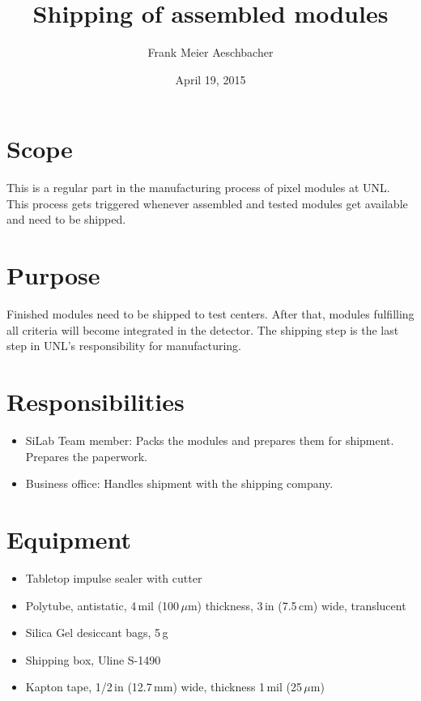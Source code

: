 \documentclass[12pt]{unlsilabsop}
\title{Shipping of assembled modules}
\date{April 19, 2015}
\author{Frank Meier Aeschbacher}
\begin{document}
\maketitle

\section{Scope}
This is a regular part in the manufacturing process of pixel modules at UNL. This process gets triggered whenever assembled and tested modules get available and need to be shipped.

\section{Purpose}
Finished modules need to be shipped to test centers. After that, modules fulfilling all criteria will become integrated in the detector. The shipping step is the last step in UNL's responsibility for manufacturing.


\section{Responsibilities}

\begin{itemize}
    \item SiLab Team member: Packs the modules and prepares them for shipment. Prepares the paperwork.
    \item Business office: Handles shipment with the shipping company.
\end{itemize}

\section{Equipment}

\begin{itemize}
    \item Tabletop impulse sealer with cutter
    \item Polytube, antistatic, 4\,mil (100\,$\mu$m) thickness, 3\,in (7.5\,cm) wide, translucent
    \item Silica Gel desiccant bags, 5\,g
    \item Shipping box, Uline S-1490
    \item Kapton tape, 1/2\,in (12.7\,mm) wide, thickness 1\,mil (25\,$\mu$m)
\end{itemize}
\end{document}
